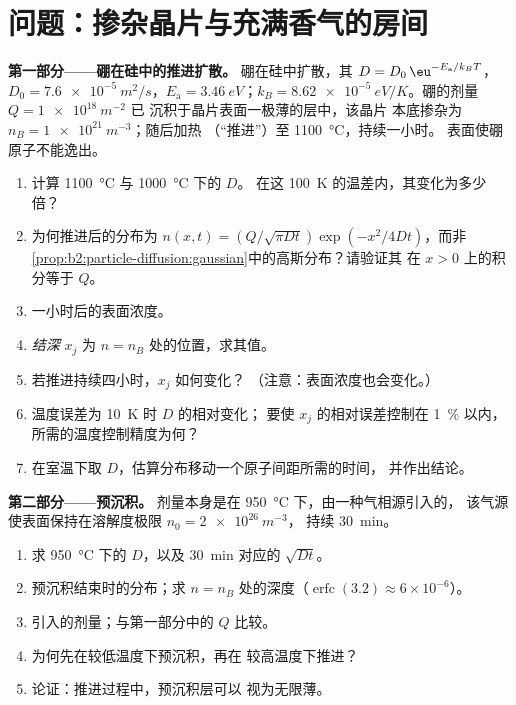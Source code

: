 \section{问题：掺杂晶片与充满香气的房间}

\begin{problem}\label{pb:b2:particle-diffusion:1}
\textbf{第一部分——硼在硅中的推进扩散。}
硼在硅中扩散，其 $D = D_0\,\eu^{-E_{\text{a}}/k_BT}$，$D_0 =
\qty{7.6e-5}{m^2/s}$，$E_{\text{a}} = \qty{3.46}{eV}$；$k_B =
\qty{8.62e-5}{eV/K}$。硼的剂量 $Q = \qty{1e18}{m^{-2}}$ 已
沉积于晶片表面一极薄的层中，该晶片
本底掺杂为 $n_B = \qty{1e21}{m^{-3}}$；随后加热
（“推进”）至 \qty{1100}{\celsius}，持续一小时。
表面使硼原子不能逸出。
\begin{enumerate}
  \item 计算 \qty{1100}{\celsius} 与 \qty{1000}{\celsius} 下的 $D$。
        在这 \qty{100}{K} 的温差内，其变化为多少倍？
  \item 为何推进后的分布为 $n(x,t) = (Q/\sqrt{\pi
        Dt})\exp(-x^2/4Dt)$，而非
        \cref{prop:b2:particle-diffusion:gaussian}中的高斯分布？请验证其
        在 $x > 0$ 上的积分等于 $Q$。
  \item 一小时后的表面浓度。
  \item \emph{结深} $x_j$ 为 $n = n_B$ 处的位置，求其值。
  \item 若推进持续四小时，$x_j$ 如何变化？
        （注意：表面浓度也会变化。）
  \item 温度误差为 \qty{10}{K} 时 $D$ 的相对变化；
        要使 $x_j$ 的相对误差控制在 \qty{1}{\%} 以内，所需的温度控制精度为何？
  \item 在室温下取 $D$，估算分布移动一个原子间距所需的时间，
        并作出结论。
\end{enumerate}

\textbf{第二部分——预沉积。}
剂量本身是在 \qty{950}{\celsius} 下，由一种气相源引入的，
该气源使表面保持在溶解度极限 $n_0 = \qty{2e26}{m^{-3}}$，
持续 \qty{30}{min}。
\begin{enumerate}[resume]
  \item 求 \qty{950}{\celsius} 下的 $D$，以及 \qty{30}{min} 对应的 $\sqrt{Dt}$。
  \item 预沉积结束时的分布；求 $n =
        n_B$ 处的深度（$\operatorname{erfc}(3.2) \approx 6 \times 10^{-6}$）。
  \item 引入的剂量；与第一部分中的 $Q$ 比较。
  \item 为何先在较低温度下预沉积，再在
        较高温度下推进？
  \item 论证：推进过程中，预沉积层可以
        视为无限薄。
\end{enumerate}


\end{problem}
